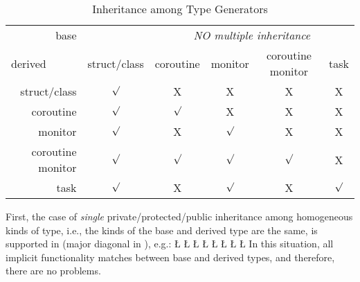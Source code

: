 \documentclass[openright,twoside]{report}
\begin{document}
\begin{table}[ht]
\begin{center}
\begin{tabular}{r||c|c|c|c|c}
\multicolumn{1}{r||}{base}	& 				& \multicolumn{4}{c}{\emph{NO multiple inheritance}}	\\
\cline{3-6}
\multicolumn{1}{l||}{derived}& struct/class	& coroutine	& monitor	& coroutine monitor	& task		\\
\hline
\hline
struct/class				& $\surd$		& \textsf{X}& \textsf{X}& \textsf{X}		& \textsf{X}\\
\hline
coroutine					& $\surd$		& $\surd$	& \textsf{X}& \textsf{X}		& \textsf{X}\\
\hline
monitor						& $\surd$		& \textsf{X}& $\surd$	& \textsf{X}		& \textsf{X}\\
\hline
coroutine monitor			& $\surd$		& $\surd$	& $\surd$	& $\surd$			& \textsf{X}\\
\hline
task						& $\surd$		& \textsf{X}& $\surd$	& \textsf{X}		& $\surd$	\\
\end{tabular}
\end{center}
\caption{Inheritance among Type Generators}
\label{f:InheritanceAmongTypeGenerators}
\end{table}

First, the case of \emph{single} private/protected/public inheritance among homogeneous kinds of type, i.e., the kinds of the base and derived type are the same, is supported in \uC (major diagonal in ), e.g.:
\LGinlinefalse\LGbegin\lgrinde
\L{}
\L{}
\CE{}\L{}
\L{}
\CE{}\L{}
\L{}
\CE{}\L{}
\L{}
\CE{}\endlgrinde\LGend
In this situation, all implicit functionality matches between base and derived types, and therefore, there are no problems.
\end{document}
